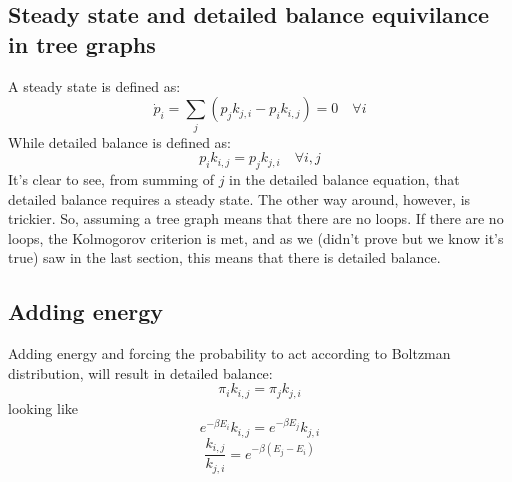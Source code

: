 \documentclass{article}
\begin{document}
\subsection{Steady state and detailed balance equivilance in tree graphs}
A steady state is defined as:
\begin{equation}
    \dot{p}_i = \sum_j \left(p_j k_{j, i} - p_i k_{i, j}\right) = 0 \quad \forall i
\end{equation}
While detailed balance is defined as:
\begin{equation}
    p_i k_{i, j} = p_j k_{j, i} \quad \forall i, j
\end{equation}
It's clear to see, from summing of $j$ in the detailed balance equation, that detailed balance requires a steady state. The other way around, however, is trickier. So, assuming a tree graph means that there are no loops. If there are no loops, the Kolmogorov criterion is met, and as we (didn't prove but we know it's true) saw in the last section, this means that there is detailed balance.
\subsection{Adding energy}
Adding energy and forcing the probability to act according to Boltzman distribution, will result in detailed balance:
\begin{equation}
    \pi_i k_{i,j} = \pi_j k_{j,i} 
\end{equation}
looking like
\begin{equation}
    e^{-\beta E_i} k_{i,j} = e^{-\beta E_j} k_{j,i} 
\end{equation}
\begin{equation}
    \boxed{\frac{k_{i,j}}{k_{j,i}} = e^{-\beta (E_j - E_i)} }
\end{equation}
\end{document}
